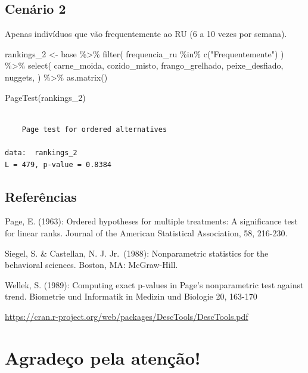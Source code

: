 \documentclass[
  letterpaper,
  DIV=11,
  numbers=noendperiod]{scrartcl}
\newenvironment{Shaded}{\begin{snugshade}}{\end{snugshade}}
\newcommand{\FunctionTok}[1]{\textcolor[rgb]{0.28,0.35,0.67}{#1}}
\newcommand{\NormalTok}[1]{\textcolor[rgb]{0.00,0.23,0.31}{#1}}
\newcommand{\OtherTok}[1]{\textcolor[rgb]{0.00,0.23,0.31}{#1}}
\newcommand{\SpecialCharTok}[1]{\textcolor[rgb]{0.37,0.37,0.37}{#1}}
\newcommand{\StringTok}[1]{\textcolor[rgb]{0.13,0.47,0.30}{#1}}
\begin{document}
\subsection{Cenário 2}\label{cenuxe1rio-2}

Apenas indivíduos que vão frequentemente ao RU (6 a 10 vezes por
semana).

\begin{Shaded}
\begin{Highlighting}[]
\NormalTok{rankings\_2 }\OtherTok{\textless{}{-}} 
\NormalTok{  base }\SpecialCharTok{\%\textgreater{}\%} 
  \FunctionTok{filter}\NormalTok{(}
\NormalTok{    frequencia\_ru }\SpecialCharTok{\%in\%} \FunctionTok{c}\NormalTok{(}\StringTok{"Frequentemente"}\NormalTok{)}
\NormalTok{    ) }\SpecialCharTok{\%\textgreater{}\%} 
  \FunctionTok{select}\NormalTok{(}
\NormalTok{    carne\_moida, }
\NormalTok{    cozido\_misto,}
\NormalTok{    frango\_grelhado, }
\NormalTok{    peixe\_desfiado,}
\NormalTok{    nuggets,}
\NormalTok{  ) }\SpecialCharTok{\%\textgreater{}\%} 
  \FunctionTok{as.matrix}\NormalTok{()}

\FunctionTok{PageTest}\NormalTok{(rankings\_2)}
\end{Highlighting}
\end{Shaded}

\begin{verbatim}

    Page test for ordered alternatives

data:  rankings_2
L = 479, p-value = 0.8384
\end{verbatim}

\subsection{Referências}\label{referuxeancias}

Page, E. (1963): Ordered hypotheses for multiple treatments: A
significance test for linear ranks. Journal of the American Statistical
Association, 58, 216-230.

Siegel, S. \& Castellan, N. J. Jr.~(1988): Nonparametric statistics for
the behavioral sciences. Boston, MA: McGraw-Hill.

Wellek, S. (1989): Computing exact p-values in Page's nonparametric test
against trend. Biometrie und Informatik in Medizin und Biologie 20,
163-170

\url{https://cran.r-project.org/web/packages/DescTools/DescTools.pdf}

\section{Agradeço pela atenção!}\label{agradeuxe7o-pela-atenuxe7uxe3o}
\end{document}
